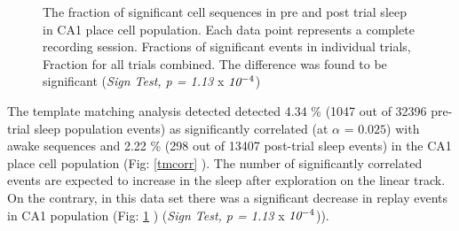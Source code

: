 \begin{figure}[H!]
\centering
{}
\caption[Pre and post trial sleep events CA1]{The fraction of significant cell sequences in pre and post trial sleep in CA1 place cell population. Each data point represents a complete recording session.  Fractions of significant events in individual trials,  Fraction for all trials combined. The difference was found to be significant (\emph{Sign Test, p = 1.13} x $\emph{10}^{-4}$)}
\label{fig:pre2postca1}
\end{figure}
The template matching analysis detected detected 4.34 \% (1047 out of 32396 pre-trial sleep population events) as significantly correlated (at $ \alpha $ = $0.025$) with awake sequences and 2.22 \% (298 out of 13407 post-trial sleep events) in the CA1 place cell population (Fig: \ref{tmcorr} ). The number of significantly correlated events are expected to increase in the sleep after exploration on the linear track. On the contrary, in this data set there was a significant decrease in replay events in CA1 population (Fig: \ref{fig:pre2postca1} ) (\emph{Sign Test, p =  1.13} x $\emph{10}^{-4}$)).
